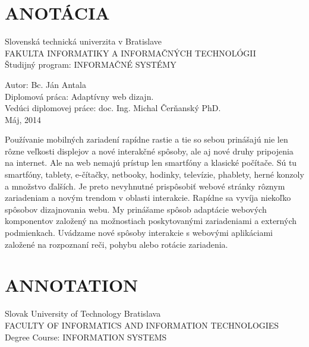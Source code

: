 
\newpage


%



\section*{ANOTÁCIA}
\thispagestyle{empty}
Slovenská technická univerzita v Bratislave\\
FAKULTA INFORMATIKY A INFORMAČNÝCH TECHNOLÓGII\\
Študijný program: INFORMAČNÉ SYSTÉMY
\newline

Autor: Bc. Ján Antala\\
Diplomová práca: Adaptívny web dizajn.\\ 
Vedúci diplomovej práce: doc. Ing. Michal Čerňanský PhD. \\
Máj, 2014
\newline

Používanie mobilných zariadení rapídne rastie a tie so sebou prinášajú nie len rôzne veľkosti displejov a nové interakčné spôsoby, ale aj nové druhy pripojenia na internet. Ale na web nemajú prístup len smartfóny a klasické počítače. Sú tu smartfóny, tablety, e-čítačky, netbooky, hodinky, televízie, phablety, herné konzoly a množstvo ďalších. Je preto nevyhnutné prispôsobiť webové stránky rôznym zariadeniam a novým trendom v oblasti interakcie. Rapídne sa vyvíja niekoľko spôsobov dizajnovania webu. My prinášame spôsob adaptácie webových komponentov založený na možnostiach poskytovanými zariadeniami a externých podmienkach. Uvádzame nové spôsoby interakcie s webovými aplikáciami založené na rozpoznaní reči, pohybu alebo rotácie zariadenia.

\newpage

\section*{ANNOTATION}
\thispagestyle{empty}
Slovak University of Technology Bratislava\\
FACULTY OF INFORMATICS AND INFORMATION TECHNOLOGIES\\
Degree Course: INFORMATION SYSTEMS
\newline

